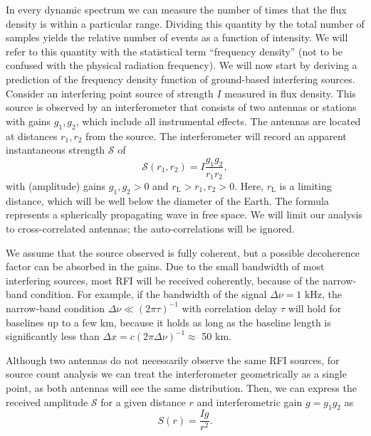 \documentclass[useAMS,usenatbib]{mn2e}
\begin{document}
In every dynamic spectrum we can measure the number of times that the flux density is within a particular range. Dividing this quantity by the total number of samples yields the relative number of events as a function of intensity. We will refer to this quantity with the statistical term ``frequency density'' (not to be confused with the physical radiation frequency). We will now start by deriving a prediction of the frequency density function of ground-based interfering sources. Consider an interfering point source of strength $I$ measured in flux density. This source is observed by an interferometer that consists of two antennas or stations with gains $g_1,g_2$, which include all instrumental effects. The antennas are located at distances $r_1,r_2$ from the source. The interferometer will record an apparent instantaneous strength $\mathcal{S}$ of
\begin{equation}
 \mathcal{S}(r_1, r_2) = I \frac{g_1 g_2}{r_1 r_2},
\end{equation}
with (amplitude) gains $g_1,g_2>0$ and $r_\textrm{L} > r_1,r_2 > 0$. Here, $r_\textrm{L}$ is a limiting distance, which will be well below the diameter of the Earth. The formula represents a spherically propagating wave in free space. We will limit our analysis to cross-correlated antennas; the auto-correlations will be ignored.

We assume that the source observed is fully coherent, but a possible decoherence factor can be absorbed in the gains. Due to the small bandwidth of most interfering sources, most RFI will be received coherently, because of the narrow-band condition. For example, if the bandwidth of the signal $\Delta\nu=1$ kHz, the narrow-band condition $\Delta \nu \ll (2\pi \tau)^{-1}$ with correlation delay $\tau$ will hold for baselines up to a few km, because it holds as long as the baseline length is significantly less than $\Delta x = c (2 \pi \Delta \nu)^{-1} \approx$ 50 km.

Although two antennas do not necessarily observe the same RFI sources, for source count analysis we can treat the interferometer geometrically as a single point, as both antennas will see the same distribution. Then, we can express the received amplitude $\mathcal{S}$ for a given distance $r$ and interferometric gain $g = g_1 g_2$ as
\begin{equation} \label{eq:amplitude-fall-off-in-free-space}
 S(r) = \frac{Ig}{r^2}.
\end{equation}
\end{document}
